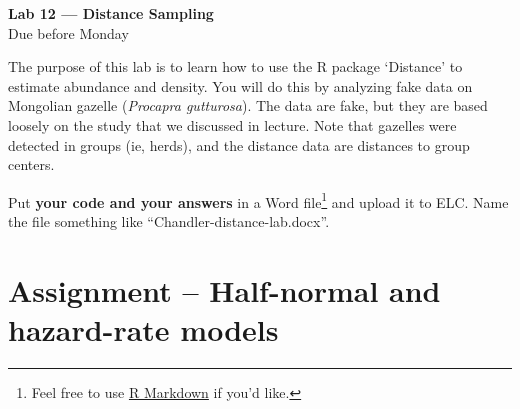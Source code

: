 \documentclass[12pt]{article}\usepackage[]{graphicx}\usepackage[]{xcolor}
\begin{document}
{
  \Large
  \centering
  {\bf Lab 12 --- Distance Sampling \\ }
  Due before Monday \\
}

\vspace{24pt}

The purpose of this lab is to learn how to use the
R package `Distance' to estimate abundance and density. You will
do this by analyzing fake data on Mongolian gazelle ({\it Procapra
  gutturosa}). The data are fake, but they are based loosely on the
study that we discussed in lecture. Note that gazelles were detected
in groups (ie, herds), and the distance data are distances to group
centers. 

Put {\bf your code and your answers} in a Word file\footnote{Feel free
  to use \href{https://rmarkdown.rstudio.com/}{R Markdown} if you'd
  like.} and upload it to ELC. Name the file something like
``Chandler-distance-lab.docx''.



\section*{Assignment -- Half-normal and hazard-rate models}
\end{document}
